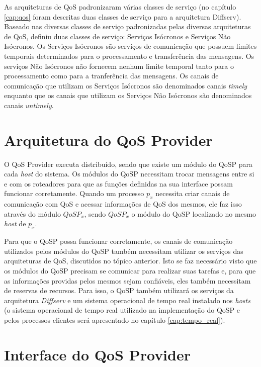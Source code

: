 	As arquiteturas de QoS padronizaram várias classes de serviço (no capítulo \ref{cap:qos} foram descritas duas classes de serviço para a arquitetura Diffserv). Baseado nas diversas classes de serviço padronizadas pelas diversas arquiteturas de QoS, \cite{GORENDER05} definiu duas classes de serviço: Serviços Isócronos e Serviços Não Isócronos. Os Serviços Isócronos são serviços de comunicação que possuem limites temporais determinados para o processamento e transferência das mensagens. Os serviços Não Isócronos não fornecem nenhum limite temporal tanto para o processamento como para a tranferência das mensagens. Os canais de comunicação que	utilizam os Serviços Isócronos são denominados canais \textit{timely} enquanto que os canais que utilizam os Serviços Não Isócronos são denominados canais \textit{untimely}.
	
\section{Arquitetura do QoS Provider}

	O QoS Provider executa distribuído, sendo que existe um módulo do QoSP para cada \textit{host} do sistema. Os módulos do QoSP necessitam trocar mensagens entre si e com os roteadores para que as funções definidas na sua interface possam funcionar corretamente. Quando um processo $p_{x}$ necessita criar canais de comunicação com QoS e acessar informações de QoS dos mesmos, ele faz isso através do módulo $QoSP_{x}$, sendo $QoSP_{x}$ o módulo do QoSP localizado no mesmo \textit{host} de $p_{x}$.
	
	Para que o QoSP possa funcionar corretamente, os canais de comunicação utilizados pelos módulos do QoSP também necessitam utilizar os serviços das arquiteturas de QoS, discutidos no tópico anterior. Isto se faz necessário visto que os módulos do QoSP precisam se comunicar para realizar suas tarefas e, para que as informações providas pelos mesmos sejam confiáveis, eles também necessitam de reservas de recursos. Para isso, o QoSP também utilizará os serviços da arquitetura \textit{Diffserv} e um sistema operacional de tempo real instalado nos \textit{hosts} (o sistema operacional de tempo real utilizado na implementação do QoSP e pelos processos clientes será apresentado no capítulo \ref{cap:tempo_real}).
	
\section{Interface do QoS Provider}


